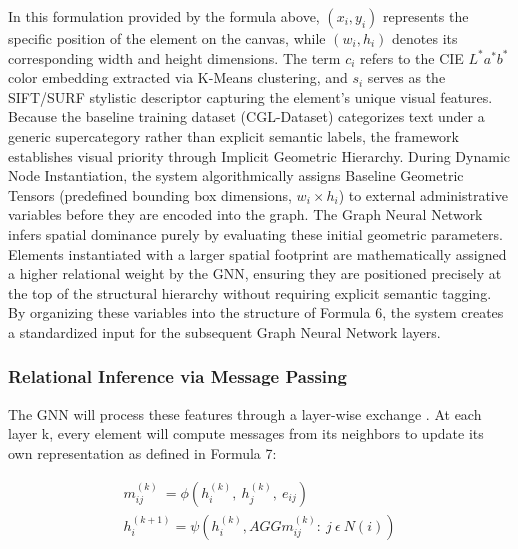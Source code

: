 \begin{refsection}
In this formulation provided by the formula above, $(x_i, y_i)$ represents the specific position of the element on the canvas, while $(w_i, h_i)$ denotes its corresponding width and height dimensions. The term $c_i$ refers to the CIE $L^*a^*b^*$ color embedding extracted via K-Means clustering, and $s_i$ serves as the SIFT/SURF stylistic descriptor capturing the element's unique visual features. Because the baseline training dataset (CGL-Dataset) categorizes text under a generic supercategory rather than explicit semantic labels, the framework establishes visual priority through Implicit Geometric Hierarchy. During Dynamic Node Instantiation, the system algorithmically assigns Baseline Geometric Tensors (predefined bounding box dimensions, $w_i \times h_i$) to external administrative variables before they are encoded into the graph. The Graph Neural Network infers spatial dominance purely by evaluating these initial geometric parameters. Elements instantiated with a larger spatial footprint are mathematically assigned a higher relational weight by the GNN, ensuring they are positioned precisely at the top of the structural hierarchy without requiring explicit semantic tagging. By organizing these variables into the structure of Formula 6, the system creates a standardized input for the subsequent Graph Neural Network layers.

\subsubsection{Relational Inference via Message Passing}
The GNN will process these features through a layer-wise exchange \cite{Bronstein2023Geometric}. At each layer k, every element will compute messages from its neighbors to update its own representation as defined in Formula 7:

\begin{center}
\begin{minipage}{0.8\textwidth}
\begin{equation}
\begin{aligned}
m_{ij}^{(k)}\ =\phi(h_i^{(k)},\ h_j^{(k)},\ e_{ij}) \\
h_i^{(k+1)}=\psi(h_i^{(k)},AGG{m_{ij}^{(k)}:\ j\ \epsilon\ N(i)})
\end{aligned}
\end{equation}
\centering
\end{minipage}
\end{center}


\end{refsection}
